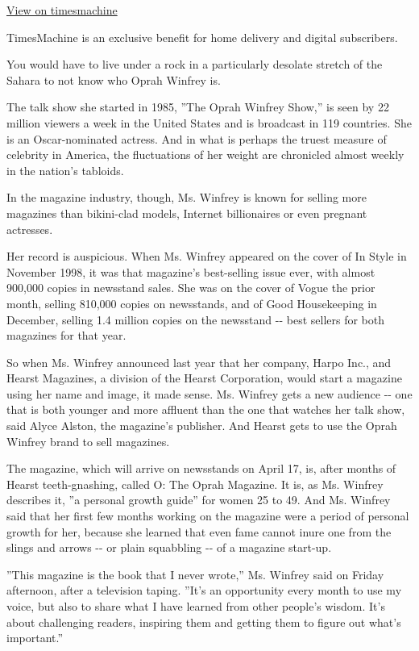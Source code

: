 \href{http://timesmachine.nytimes3xbfgragh.onion/timesmachine/2000/04/03/587800.html}{View
on timesmachine}

TimesMachine is an exclusive benefit for home delivery and digital
subscribers.

You would have to live under a rock in a particularly desolate stretch
of the Sahara to not know who Oprah Winfrey is.

The talk show she started in 1985, ''The Oprah Winfrey Show,'' is seen
by 22 million viewers a week in the United States and is broadcast in
119 countries. She is an Oscar-nominated actress. And in what is perhaps
the truest measure of celebrity in America, the fluctuations of her
weight are chronicled almost weekly in the nation's tabloids.

In the magazine industry, though, Ms. Winfrey is known for selling more
magazines than bikini-clad models, Internet billionaires or even
pregnant actresses.

Her record is auspicious. When Ms. Winfrey appeared on the cover of In
Style in November 1998, it was that magazine's best-selling issue ever,
with almost 900,000 copies in newsstand sales. She was on the cover of
Vogue the prior month, selling 810,000 copies on newsstands, and of Good
Housekeeping in December, selling 1.4 million copies on the newsstand
-\/- best sellers for both magazines for that year.

So when Ms. Winfrey announced last year that her company, Harpo Inc.,
and Hearst Magazines, a division of the Hearst Corporation, would start
a magazine using her name and image, it made sense. Ms. Winfrey gets a
new audience -\/- one that is both younger and more affluent than the
one that watches her talk show, said Alyce Alston, the magazine's
publisher. And Hearst gets to use the Oprah Winfrey brand to sell
magazines.

The magazine, which will arrive on newsstands on April 17, is, after
months of Hearst teeth-gnashing, called O: The Oprah Magazine. It is, as
Ms. Winfrey describes it, ''a personal growth guide'' for women 25 to
49. And Ms. Winfrey said that her first few months working on the
magazine were a period of personal growth for her, because she learned
that even fame cannot inure one from the slings and arrows -\/- or plain
squabbling -\/- of a magazine start-up.

''This magazine is the book that I never wrote,'' Ms. Winfrey said on
Friday afternoon, after a television taping. ''It's an opportunity every
month to use my voice, but also to share what I have learned from other
people's wisdom. It's about challenging readers, inspiring them and
getting them to figure out what's important.''

